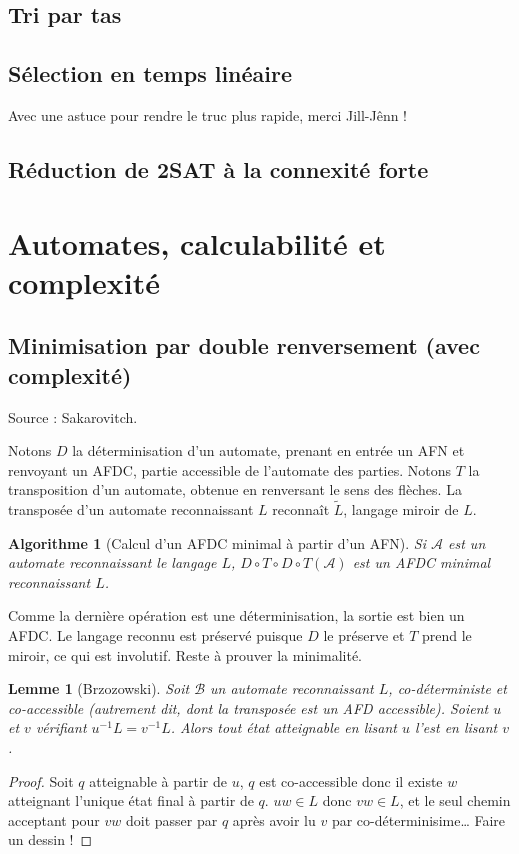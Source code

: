 \documentclass[a4paper, 11pt]{article}
\newtheorem*{algo}{Algorithme}
\newtheorem*{lemma}{Lemme}
\begin{document}
\subsection{Tri par tas}

\subsection{Sélection en temps linéaire}

Avec une astuce pour rendre le truc plus rapide, merci Jill-Jênn !

\subsection{Réduction de 2SAT à la connexité forte}


\section{Automates, calculabilité et complexité}

\subsection{Minimisation par double renversement (avec complexité)}

Source : Sakarovitch.

Notons $D$ la déterminisation d'un automate, prenant en entrée un AFN et
renvoyant un AFDC, partie accessible de l'automate des parties. Notons $T$ la
transposition d'un automate, obtenue en renversant le sens des flèches. La
transposée d'un automate reconnaissant $L$ reconnaît $\tilde{L}$, langage miroir
de $L$.

\begin{algo}[Calcul d'un AFDC minimal à partir d'un AFN]
  Si $\mathcal{A}$ est un automate reconnaissant le langage $L$, $D \circ T
  \circ D \circ T(\mathcal{A})$ est un AFDC minimal reconnaissant $L$.
\end{algo}

Comme la dernière opération est une déterminisation, la sortie est bien un AFDC.
Le langage reconnu est préservé puisque $D$ le préserve et $T$ prend le miroir,
ce qui est involutif. Reste à prouver la minimalité.

\begin{lemma}[Brzozowski]
  Soit $\mathcal{B}$ un automate reconnaissant $L$, \emph{co-déterministe} et
  \emph{co-accessible} (autrement dit, dont la transposée est un AFD
  accessible). Soient $u$ et $v$ vérifiant $u^{-1}L = v^{-1}L$. Alors tout état
  atteignable en lisant $u$ l'est en lisant $v$.
\end{lemma}
\begin{proof}
  Soit $q$ atteignable à partir de $u$, $q$ est co-accessible donc il existe $w$
  atteignant l'unique état final à partir de $q$. $uw \in L$ donc $vw \in L$, et
  le seul chemin acceptant pour $vw$ doit passer par $q$ après avoir lu $v$ par
  co-déterminisime… Faire un dessin !
\end{proof}
\end{document}
